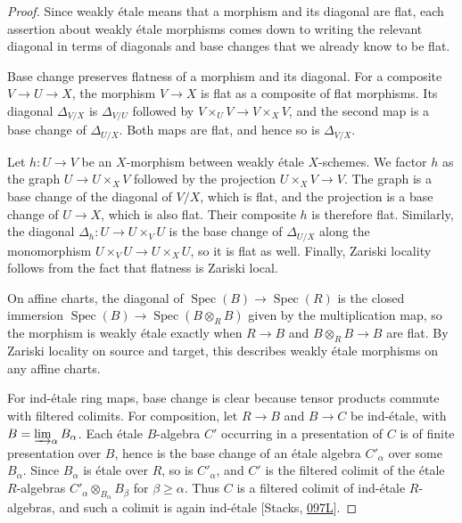 \documentclass[11pt]{article}
\begin{document}
\begin{proof}[{Proof}]\label{bp11}%
Since weakly étale means that a morphism and its diagonal are flat, each assertion about weakly étale morphisms comes down to writing the relevant diagonal in terms of diagonals and base changes that we already know to be flat.

Base change preserves flatness of a morphism and its diagonal. For a composite \(V\to U\to X\), the morphism \(V\to X\) is flat as a composite of flat morphisms. Its diagonal \(\Delta_{V/X}\) is \(\Delta_{V/U}\) followed by \(V\times_UV\to V\times_XV\), and the second map is a base change of \(\Delta_{U/X}\). Both maps are flat, and hence so is \(\Delta_{V/X}\).

Let \(h:U\to V\) be an \(X\)-morphism between weakly étale \(X\)-schemes. We factor \(h\) as the graph \(U\to U\times_XV\) followed by the projection \(U\times_XV\to V\). The graph is a base change of the diagonal of \(V/X\), which is flat, and the projection is a base change of \(U\to X\), which is also flat. Their composite \(h\) is therefore flat. Similarly, the diagonal \(\Delta_h:U\to
U\times_VU\) is the base change of \(\Delta_{U/X}\) along the monomorphism \(U\times_VU\to U\times_XU\), so it is flat as well. Finally, Zariski locality follows from the fact that flatness is Zariski local.

On affine charts, the diagonal of \(\operatorname{Spec}(B)\to\operatorname{Spec}(R)\) is the closed immersion \(\operatorname{Spec}(B)\to\operatorname{Spec}(B\otimes_RB)\) given by the multiplication map, so the morphism is weakly étale exactly when \(R\to B\) and \(B\otimes_RB\to B\) are flat. By Zariski locality on source and target, this describes weakly étale morphisms on any affine charts.

For ind-étale ring maps, base change is clear because tensor products commute with filtered colimits. For composition, let \(R\to B\) and \(B\to C\) be ind-étale, with \(B=\varinjlim_\alpha B_\alpha\). Each étale \(B\)-algebra \(C'\) occurring in a presentation of \(C\) is of finite presentation over \(B\), hence is the base change of an étale algebra \(C'_\alpha\) over some \(B_\alpha\). Since \(B_\alpha\) is étale over \(R\), so is \(C'_\alpha\), and \(C'\) is the filtered colimit of the étale \(R\)-algebras \(C'_\alpha\otimes_{B_\alpha}B_\beta\) for \(\beta\geq\alpha\). Thus \(C\) is a filtered colimit of ind-étale \(R\)-algebras, and such a colimit is again ind-étale [Stacks, \href{https://stacks.math.columbia.edu/tag/097L}{097L}].
\end{proof}
\end{document}
